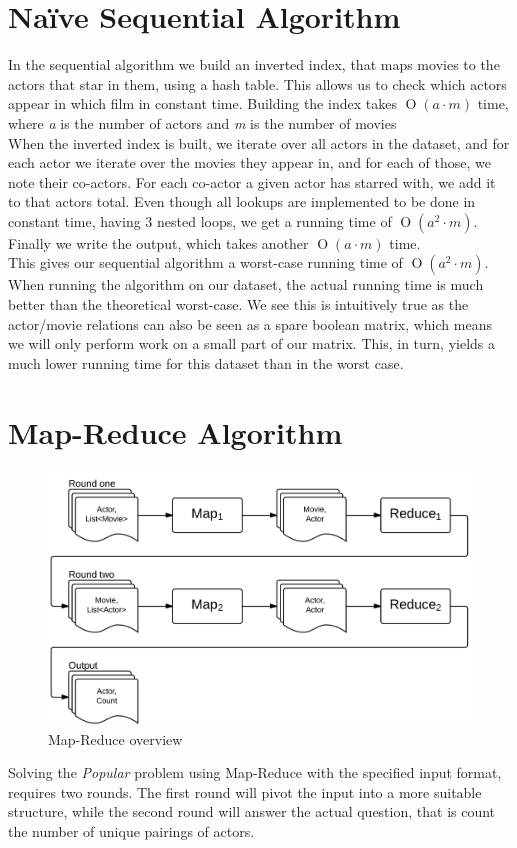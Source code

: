 \documentclass[a4paper,11pt]{article}
\newcommand{\BigO}[1]{\ensuremath{\operatorname{O}\left(#1\right)}}
\begin{document}
\section{Naïve Sequential Algorithm}
\label{sub:sequential}
In the sequential algorithm we build an inverted index, that maps movies to the actors that star in them, using a hash table. This allows us to check which actors appear in which film in constant time. Building the index takes \BigO{a\cdot m} time, where \emph{a} is the number of actors and \emph{m} is the number of movies\\

When the inverted index is built, we iterate over all actors in the dataset, and for each actor we iterate over the movies they appear in, and for each of those, we note their co-actors. For each co-actor a given actor has starred with, we add it to that actors total. Even though all lookups are implemented to be done in constant time, having 3 nested loops, we get a running time of \BigO{a^2 \cdot m}. Finally we write the output, which takes another \BigO{a \cdot m} time.\\

This gives our sequential algorithm a worst-case running time of \BigO{a^2 \cdot m}. When running the algorithm on our dataset, the actual running time is much better than the theoretical worst-case. We see this is intuitively true as the actor/movie relations can also be seen as a spare boolean matrix, which means we will only perform work on a small part of our matrix. This, in turn, yields a much lower running time for this dataset than in the worst case.

\section{Map-Reduce Algorithm}
\label{sub:map-reduce}
\begin{figure}[H]
\centering \includegraphics[scale=0.2]{map-reduce-figure.png}
\vspace{-10pt}
\caption{Map-Reduce overview}
\label{fig:map-reduce}
\vspace{-10pt}
\end{figure}
Solving the \emph{Popular} problem using Map-Reduce with the specified input format, requires two rounds. The first round will pivot the input into a more suitable structure, while the second round will answer the actual question, that is count the number of unique pairings of actors.
\end{document}
